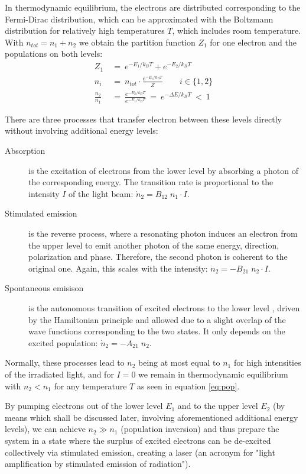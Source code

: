 In thermodynamic equilibrium, the electrons are distributed corresponding to the Fermi-Dirac distribution, which can be approximated with the Boltzmann distribution for relatively high temperatures $T$, which includes room temperature. With $n_{tot}=n_1 + n_2$ we obtain the partition function $Z_1$ for one electron and the populations on both levels:
\begin{align}
Z_1  ~&=~ e^{-E_1/k_B T} + e^{-E_2/k_B T} \\
n_i ~&=~ n_{tot} \cdot \frac{e^{-E_i/k_B T}}{Z} \qquad i \in \{1, 2\}\\
\frac{n_2}{n_1} ~&=~ \frac{e^{-E_2/k_B T}}{e^{-E_1/k_B T}} ~=~ e^{- \Delta E/k_B T} ~<~ 1	\label{eq:pop}
\end{align}

There are three processes that transfer electron between these levels directly without involving additional energy levels:
\begin{description}
\item[Absorption] is the excitation of electrons from the lower level by absorbing a photon of the corresponding energy. The transition rate is proportional to the intensity $I$ of the light beam: $\dot n_2 = B_{12} \; n_1 \cdot I$.
\item[Stimulated emission] is the reverse process, where a resonating photon induces an electron from the upper level to emit another photon of the same energy, direction, polarization and phase. Therefore, the second photon is coherent to the original one. Again, this scales with the intensity: $\dot n_2 = -B_{21} \; n_2 \cdot I$.
\item[Spontaneous emisison] is the autonomous transition of excited electrons to the lower level , driven by the Hamiltonian principle and allowed due to a slight overlap of the wave functions corresponding to the two states. It only depends on the excited population: $\dot n_2 = -A_{21} \; n_2$.
\end{description}

Normally, these processes lead to $n_2$ being at most equal to $n_1$ for high intensities of the irradiated light, and for $I=0$ we remain in thermodynamic equilibrium with $n_2 < n_1$ for any temperature $T$  as seen in equation \eqref{eq:pop}.

By pumping electrons out of the lower level $E_1$ and to the upper level $E_2$ (by means which shall be discussed later, involving aforementioned additional energy levels), we can achieve $n_2 \gg n_1$ (population inversion) and thus prepare the system in a state where the surplus of excited electrons can be de-excited collectively via stimulated emission, creating a laser (an acronym for "light amplification by stimulated emission of radiation").

